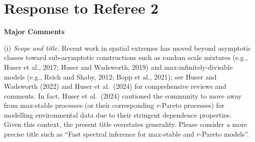 \documentclass[12pt
]{article}
\begin{document}
\begin{Res}



\end{Res}

\dashline


\section*{Response to Referee 2}

\medskip

\noindent\textbf{Major Comments}

\medskip

\begin{Comments}
(i) \emph{Scope and title.} Recent work in spatial extremes has moved beyond asymptotic classes toward sub-asymptotic constructions such as random scale mixtures (e.g., Huser et al., 2017; Huser and Wadsworth, 2019) and max-infinitely-divisible models (e.g., Reich and Shaby, 2012; Bopp et al., 2021); see Huser and Wadsworth (2022) and Huser et al.\ (2024) for comprehensive reviews and comments. In fact, Huser et al.\ (2024) cautioned the community to move away from max-stable processes (or their corresponding $r$-Pareto processes) for modelling environmental data due to their stringent dependence properties. Given this context, the present title overstates generality. Please consider a more precise title such as ``Fast spectral inference for max-stable and $r$-Pareto models''.
\end{Comments}
\end{document}
